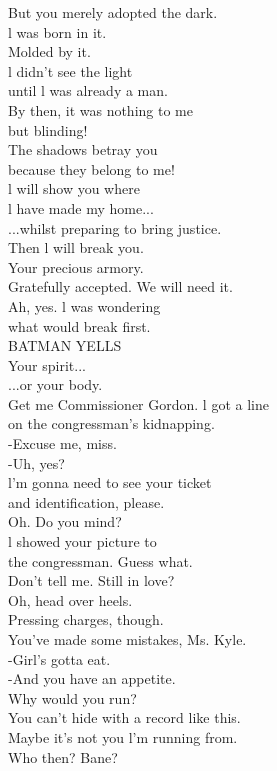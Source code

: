 \documentclass{article}
\begin{document}
\begin{multicols}{3}
But you merely adopted the dark.\\
l was born in it.\\
Molded by it.\\
l didn't see the light\\
until l was already a man.\\
By then, it was nothing to me\\
but blinding!\\
The shadows betray you\\
because they belong to me!\\
l will show you where\\
l have made my home...\\
...whilst preparing to bring justice.\\
Then l will break you.\\
Your precious armory.\\
Gratefully accepted. We will need it.\\
Ah, yes. l was wondering\\
what would break first.\\
BATMAN YELLS\\
Your spirit...\\
...or your body.\\
Get me Commissioner Gordon. l got a line\\
on the congressman's kidnapping.\\
-Excuse me, miss.\\
-Uh, yes?\\
l'm gonna need to see your ticket\\
and identification, please.\\
Oh. Do you mind?\\
l showed your picture to\\
the congressman. Guess what.\\
Don't tell me. Still in love?\\
Oh, head over heels.\\
Pressing charges, though.\\
You've made some mistakes, Ms. Kyle.\\
-Girl's gotta eat.\\
-And you have an appetite.\\
Why would you run?\\
You can't hide with a record like this.\\
Maybe it's not you l'm running from.\\
Who then? Bane?\\

\end{multicols}
\end{document}
